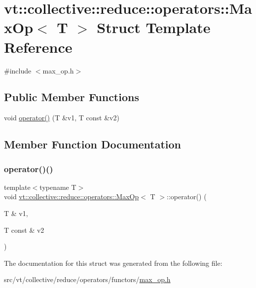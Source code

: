 \hypertarget{structvt_1_1collective_1_1reduce_1_1operators_1_1_max_op}{}\section{vt\+:\+:collective\+:\+:reduce\+:\+:operators\+:\+:Max\+Op$<$ T $>$ Struct Template Reference}
\label{structvt_1_1collective_1_1reduce_1_1operators_1_1_max_op}


{\ttfamily \#include $<$max\+\_\+op.\+h$>$}

\subsection*{Public Member Functions}
\begin{DoxyCompactItemize}
\item 
void \hyperlink{structvt_1_1collective_1_1reduce_1_1operators_1_1_max_op_aab89f5f272a308e19cd5f36f29869112}{operator()} (T \&v1, T const \&v2)
\end{DoxyCompactItemize}


\subsection{Member Function Documentation}
\mbox{\label{structvt_1_1collective_1_1reduce_1_1operators_1_1_max_op_aab89f5f272a308e19cd5f36f29869112}} 
\subsubsection{\texorpdfstring{operator()()}{operator()()}}
{\footnotesize\ttfamily template$<$typename T$>$ \\
void \hyperlink{structvt_1_1collective_1_1reduce_1_1operators_1_1_max_op}{vt\+::collective\+::reduce\+::operators\+::\+Max\+Op}$<$ T $>$\+::operator() (\begin{DoxyParamCaption}\item[{T \&}]{v1,  }\item[{T const \&}]{v2 }\end{DoxyParamCaption})\hspace{0.3cm}{\ttfamily [inline]}}



The documentation for this struct was generated from the following file\+:\begin{DoxyCompactItemize}
\item 
src/vt/collective/reduce/operators/functors/\hyperlink{max__op_8h}{max\+\_\+op.\+h}\end{DoxyCompactItemize}
